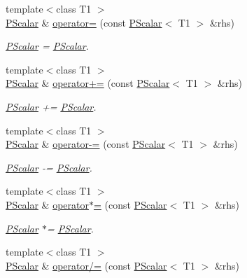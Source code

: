 \begin{DoxyCompactItemize}
{\footnotesize template$<$class T1 $>$ }\\\mbox{\hyperlink{classENSEM_1_1PScalar}{P\+Scalar}} \& \mbox{\hyperlink{classENSEM_1_1PScalar_ae69d6f1ad8ec0b65652f8d16c5f97b11}{operator=}} (const \mbox{\hyperlink{classENSEM_1_1PScalar}{P\+Scalar}}$<$ T1 $>$ \&rhs)
\begin{DoxyCompactList}\small\item\em \mbox{\hyperlink{classENSEM_1_1PScalar}{P\+Scalar}} = \mbox{\hyperlink{classENSEM_1_1PScalar}{P\+Scalar}}. \end{DoxyCompactList}\item 
{\footnotesize template$<$class T1 $>$ }\\\mbox{\hyperlink{classENSEM_1_1PScalar}{P\+Scalar}} \& \mbox{\hyperlink{classENSEM_1_1PScalar_a9c8d9e51f9d0a13b4b4aa9992812eea8}{operator+=}} (const \mbox{\hyperlink{classENSEM_1_1PScalar}{P\+Scalar}}$<$ T1 $>$ \&rhs)
\begin{DoxyCompactList}\small\item\em \mbox{\hyperlink{classENSEM_1_1PScalar}{P\+Scalar}} += \mbox{\hyperlink{classENSEM_1_1PScalar}{P\+Scalar}}. \end{DoxyCompactList}\item 
{\footnotesize template$<$class T1 $>$ }\\\mbox{\hyperlink{classENSEM_1_1PScalar}{P\+Scalar}} \& \mbox{\hyperlink{classENSEM_1_1PScalar_a8c0e633dbd87bcb922496bfaf136752c}{operator-\/=}} (const \mbox{\hyperlink{classENSEM_1_1PScalar}{P\+Scalar}}$<$ T1 $>$ \&rhs)
\begin{DoxyCompactList}\small\item\em \mbox{\hyperlink{classENSEM_1_1PScalar}{P\+Scalar}} -\/= \mbox{\hyperlink{classENSEM_1_1PScalar}{P\+Scalar}}. \end{DoxyCompactList}\item 
{\footnotesize template$<$class T1 $>$ }\\\mbox{\hyperlink{classENSEM_1_1PScalar}{P\+Scalar}} \& \mbox{\hyperlink{classENSEM_1_1PScalar_addccfa9164f9d80554657387932185c4}{operator$\ast$=}} (const \mbox{\hyperlink{classENSEM_1_1PScalar}{P\+Scalar}}$<$ T1 $>$ \&rhs)
\begin{DoxyCompactList}\small\item\em \mbox{\hyperlink{classENSEM_1_1PScalar}{P\+Scalar}} $\ast$= \mbox{\hyperlink{classENSEM_1_1PScalar}{P\+Scalar}}. \end{DoxyCompactList}\item 
{\footnotesize template$<$class T1 $>$ }\\\mbox{\hyperlink{classENSEM_1_1PScalar}{P\+Scalar}} \& \mbox{\hyperlink{classENSEM_1_1PScalar_a72bf5e7494fc6c8831d0003f8fb62a16}{operator/=}} (const \mbox{\hyperlink{classENSEM_1_1PScalar}{P\+Scalar}}$<$ T1 $>$ \&rhs)

\end{DoxyCompactItemize}
